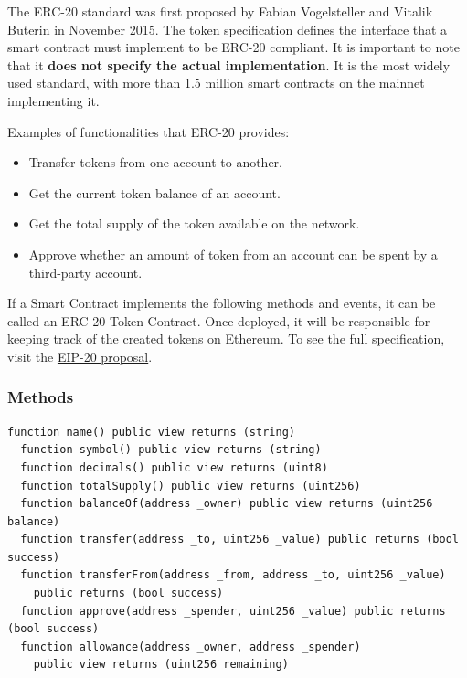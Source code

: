 \documentclass[12pt]{article}
\begin{document}
The ERC-20 standard was first proposed by Fabian Vogelsteller and Vitalik Buterin in November 2015. The token specification defines the interface that a smart contract must implement to be ERC-20 compliant. It is important to note that it \textbf{does not specify the actual implementation}. It is the most widely used standard, with more than 1.5 million smart contracts on the mainnet implementing it.

\medskip
\noindent
Examples of functionalities that ERC-20 provides:

\begin{itemize}
  \item Transfer tokens from one account to another.
  \item Get the current token balance of an account.
  \item Get the total supply of the token available on the network.
  \item Approve whether an amount of token from an account can be spent by a third-party account.
\end{itemize}

If a Smart Contract implements the following methods and events, it can be called an ERC-20 Token Contract. Once deployed, it will be responsible for keeping track of the created tokens on Ethereum. To see the full specification, visit the \href{https://eips.ethereum.org/EIPS/eip-20}{EIP-20 proposal}.

\subsubsection*{Methods}

\noindent
\begin{minipage}{\textwidth}
\begin{lstlisting}[language=Solidity]
  function name() public view returns (string)
  function symbol() public view returns (string)
  function decimals() public view returns (uint8)
  function totalSupply() public view returns (uint256)
  function balanceOf(address _owner) public view returns (uint256 balance)
  function transfer(address _to, uint256 _value) public returns (bool success)
  function transferFrom(address _from, address _to, uint256 _value) 
    public returns (bool success)
  function approve(address _spender, uint256 _value) public returns (bool success)
  function allowance(address _owner, address _spender) 
    public view returns (uint256 remaining)  
\end{lstlisting}
\end{minipage}
\end{document}
